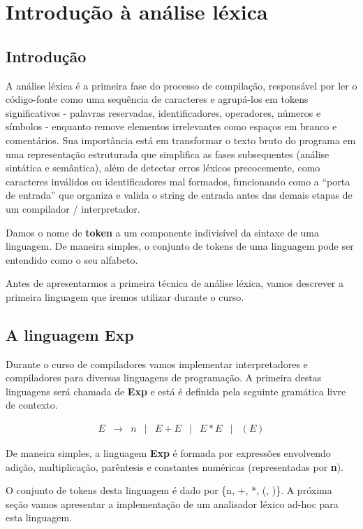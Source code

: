 \chapter{Introdução à análise léxica}

\section{Introdução}

A análise léxica é a primeira fase do processo de compilação,
responsável por ler o código-fonte como uma sequência de caracteres e
agrupá-los em tokens significativos - palavras reservadas,
identificadores, operadores, números e símbolos - enquanto remove
elementos irrelevantes como espaços em branco e comentários. Sua
importância está em transformar o texto bruto do programa em uma
representação estruturada que simplifica as fases subsequentes
(análise sintática e semântica), além de detectar erros léxicos
precocemente, como caracteres inválidos ou identificadores mal
formados, funcionando como a ``porta de entrada'' que organiza e
valida o string de entrada antes das demais etapas de um compilador /
interpretador.

Damos o nome de \textbf{token} a um componente indivisível
da sintaxe de uma linguagem. De maneira simples, o conjunto de
tokens de uma linguagem pode ser entendido como o seu alfabeto.

Antes de apresentarmos a primeira técnica de análise léxica, vamos
descrever a primeira linguagem que iremos utilizar durante o curso.

\section{A linguagem Exp}

Durante o curso de compiladores vamos implementar interpretadores e
compiladores para diversas linguagens de programação. A primeira
destas linguagens será chamada de \textbf{Exp} e está é definida pela
seguinte gramática livre de contexto.

\[
  \begin{array}{lclclclcl}
    E & \to & n & | & E + E & | & E * E & | & (E)
  \end{array}
\]

De maneira simples, a linguagem \textbf{Exp} é formada por expressões
envolvendo adição, multiplicação, parêntesis e constantes numéricas
(representadas por \textbf{n}).

O conjunto de tokens desta linguagem é dado por \{n, +, *, (, )\}. A
próxima seção vamos apresentar a implementação de um analisador
léxico ad-hoc para esta linguagem.

